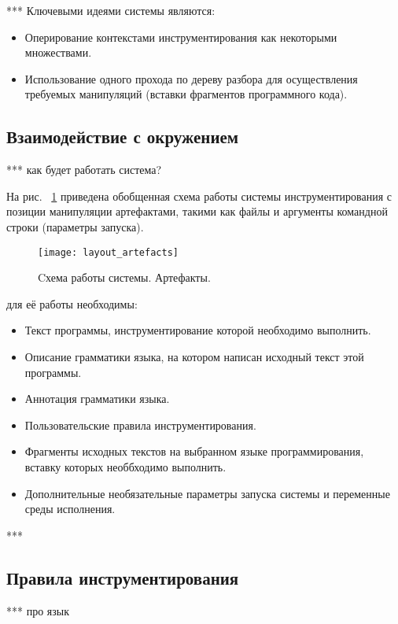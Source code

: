 ***
Ключевыми идеями системы являются:
\begin{itemize}
  \item Оперирование контекстами инструментирования как некоторыми множествами.
  \item Использование одного прохода по дереву разбора для осуществления требуемых манипуляций (вставки фрагментов программного кода).
\end{itemize}

\subsection{Взаимодействие с окружением}

***
как будет работать система?

На рис. ~\ref{fig:layout_artefacts} приведена обобщенная схема работы системы инструментирования с позиции манипуляции артефактами, такими как файлы и аргументы командной строки (параметры запуска).

\begin{figure}[!h]
	\centering
	\texttt{[image: layout\_artefacts]}
	\caption{Cхема работы системы. Артефакты.}
	\label{fig:layout_artefacts}
\end{figure}

для её работы необходимы:
\begin{itemize}
  \item Текст программы, инструментирование которой необходимо выполнить.
  \item Описание грамматики языка, на котором написан исходный текст этой программы.
  \item Аннотация грамматики языка.
  \item Пользовательские правила инструментирования.
  \item Фрагменты исходных текстов на выбранном языке программирования, вставку которых необбходимо выполнить.
  \item Дополнительные необязательные параметры запуска системы и переменные среды исполнения.
\end{itemize}

***

\subsection{Правила инструментирования}

***
про язык

